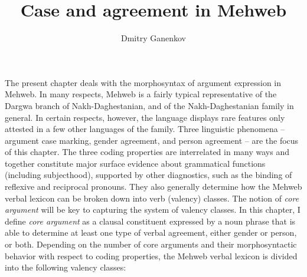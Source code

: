 ﻿\documentclass[output=paper]{langsci/langscibook}
\title{Case and agreement in Mehweb}
\author{Dmitry Ganenkov\affiliation{University of Bamberg;
National Research University Higher School of Economics}}
\begin{document}
\maketitle

{\def\thefootnote{}

}



\let\exfont\rm
\let\eachwordone\rm

The present chapter deals with the morphosyntax of argument expression
in Mehweb. In many respects, Mehweb is a fairly typical representative
of the Dargwa branch of Nakh-Daghestanian, and of the Nakh-Daghestanian family in general.
In certain respects, however, the language displays rare features only
attested in a few other languages of the family. Three linguistic
phenomena – argument case marking, gender agreement, and person
agreement – are the focus of this chapter. The three coding properties
are interrelated in many ways and together constitute major surface
evidence about grammatical functions (including subjecthood), supported
by other diagnostics, such as the binding of reflexive and reciprocal
pronouns. They also generally determine how the Mehweb verbal lexicon
can be broken down into verb (valency) classes. The notion of \emph{core
argument} will be key to capturing the system of valency classes. In
this chapter, I define \emph{core argument} as a clausal constituent
expressed by a noun phrase that is able to determine at least one type
of verbal agreement, either gender or person, or both. Depending on the
number of core arguments and their morphosyntactic behavior with respect
to coding properties, the Mehweb verbal lexicon is divided into the
following valency classes:
\end{document}
